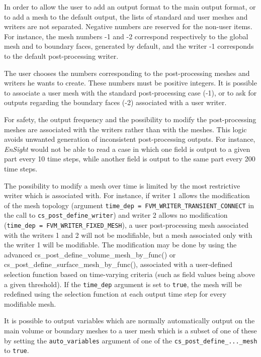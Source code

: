 {{{In order to allow the user to add an output format to
the main output format, or to add a mesh to the default
output, the lists of standard and user meshes and writers are not
separated. Negative numbers are reserved for the non-user items. For
instance, the mesh numbers -1 and -2 correspond respectively to the global
mesh and to boundary faces, generated by default, and the writer -1
corresponds to the default post-processing writer.

The user chooses the numbers corresponding to the post-processing
meshes and writers he wants to create. These numbers must be positive
integers. It is possible to associate a user mesh with the standard
post-processing case (-1), or to ask for outputs regarding the boundary
faces (-2) associated with a user writer.

For safety, the output frequency and the possibility to modify the
post-processing meshes are associated with the writers rather than
with the meshes. This logic avoids unwanted generation of
inconsistent post-processing outputs. For instance, {\em EnSight} would not
be able to read a case in which one field is output to a given part
every 10 time steps, while another field is output to the same part
every 200 time steps.

The possibility to modify a mesh over time is limited by the most restrictive
writer which is associated with. For instance, if writer
1 allows the modification of the mesh topology (argument \texttt{time\_dep
= FVM\_WRITER\_TRANSIENT\_CONNECT} in the call to \texttt{cs\_post\_define\_writer}) and writer 2 allows no
modification (\texttt{time\_dep = FVM\_WRITER\_FIXED\_MESH}),
a user post-processing mesh
associated with the writers 1 and 2 will not be modifiable, but a
mesh associated only with the writer 1 will be modifiable. The
modification may be done by using the advanced
cs\_post\_define\_volume\_mesh\_by\_func() or
cs\_post\_define\_surface\_mesh\_by\_func(), associated with a user-defined
selection function based on time-varying criteria (such as field values
being above a given threshold). If the \texttt{time\_dep} argument is
set to \texttt{true}, the mesh will be redefined using the selection
function at each output time step for every modifiable mesh.

It is possible to output variables which are normally automatically
output on the main volume or boundary meshes to a user mesh which is a subset
of one of these by setting the \texttt{auto\_variables} argument of
one of the \texttt{cs\_post\_define\_...\_mesh} to \texttt{true}.

}}}
